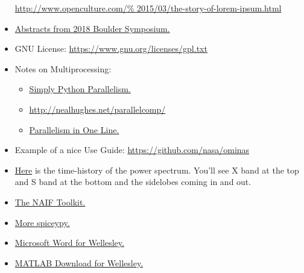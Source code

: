 \documentclass[crop=false,class=article,oneside]{standalone}
\begin{document}
\begin{itemize}
                      \url{http://www.openculture.com/%
                           2015/03/the-story-of-lorem-ipsum.html}
                \item \href{http://lasp.colorado.edu/media/%
                            projects/cassini/docs/%
                            Cassini_Science_Symposium_2018_%
                            Program-LowResForWeb.pdf}
                           {Abstracts from 2018 Boulder Symposium.}
                \item GNU License:
                      \url{https://www.gnu.org/licenses/gpl.txt}
                \item Notes on Multiprocessing:
                \begin{itemize}
                    \item \href{https://stsievert.com/blog/2014/07/30/%
                                simple-python-parallelism/}
                               {Simply Python Parallelism.}
                    \item \url{http://nealhughes.net/parallelcomp/}
                    \item \href{http://chriskiehl.com/article/%
                                parallelism-in-one-line/}
                               {Parallelism in One Line.}
                \end{itemize}
                \item Example of a nice Use Guide:
                      \url{https://github.com/nasa/ominas}
                \item \href{https://www.youtube.com/%
                            watch?time_continue=2&v=s-Xw6i61N9o}
                           {Here}
                      is the time-history of the power spectrum.
                      You'll see X band at the top and S band at
                      the bottom and the sidelobes coming in and out.
                \item \href{https://naif.jpl.nasa.gov/naif/toolkit.html}
                           {The NAIF Toolkit.}
                \item \href{http://spiceypy.readthedocs.io/en/%
                            master/exampleone.html}
                           {More spiceypy.}
                \item \href{http://www.wellesley.edu/lts/%
                            office365\#38MbQkK5QQom6URk.97}
                           {Microsoft Word for Wellesley.}
                \item \href{http://www.wellesley.edu/lts/%
                            techsupport/macs\#OyZifeYOQ4rso8ep.97}
                           {MATLAB Download for Wellesley.}
            \end{itemize}
\end{document}
